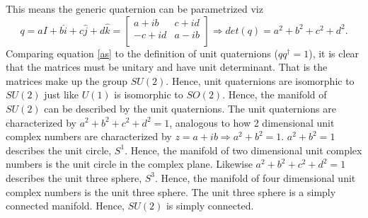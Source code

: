This means the generic quaternion can be parametrized viz
\begin{equation}
	q=aI+b\hat{i}+c\hat{j}+d\hat{k}=\begin{bmatrix}
		a+ib & c+id\\
		-c+id & a-ib\\
	\end{bmatrix}\Rightarrow det(q)=a^2+b^2+c^2+d^2.
	\label{as}
\end{equation} 
Comparing equation \eqref{as} to the definition of unit quaternions ($qq^\dagger=1$), it is clear that the matrices must be unitary and have unit determinant. That is the matrices make up the group $SU(2)$. Hence, unit quaternions are isomorphic to $SU(2)$ just like $U(1)$ is isomorphic to $SO(2)$. Hence, the manifold of $SU(2)$ can be described by the unit quaternions. The unit quaternions are characterized by $a^2+b^2+c^2+d^2=1$, analogous to how 2 dimensional unit complex numbers are characterized by $z=a+ib\Rightarrow a^2+b^2=1$. $a^2+b^2=1$ describes the unit circle, $S^1$. Hence, the manifold of two dimensional unit complex numbers is the unit circle in the complex plane. Likewise $a^2+b^2+c^2+d^2=1$ describes the unit three sphere, $S^3$. Hence, the manifold of four dimensional unit complex numbers is the unit three sphere. The unit three sphere is a simply connected manifold. Hence, $SU(2)$ is simply connected.

